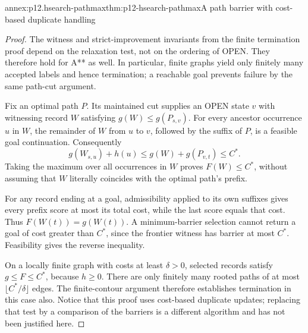 \begin{annexitem}{annex:p12.hsearch-pathmax}{thm:p12-hsearch-pathmax}{A path barrier with cost-based duplicate handling}
\begin{proof}
The witness and strict-improvement invariants from the finite termination
proof depend on the relaxation test, not on the ordering of OPEN.
They therefore hold for A** as well. In particular, finite graphs yield
only finitely many accepted labels and hence termination; a reachable
goal prevents failure by the same path-cut argument.

Fix an optimal path \(P\). Its maintained cut supplies an OPEN state
\(v\) with witnessing record \(W\) satisfying
\(g(W)\le g(P_{s,v})\). For every ancestor occurrence \(u\) in
\(W\), the remainder of \(W\) from \(u\) to \(v\), followed
by the suffix of \(P\), is a feasible goal continuation. Consequently
\[
 g(W_{s,u})+h(u)
 \le g(W)+g(P_{v,t})\le C^*.
\]
Taking the maximum over all occurrences in \(W\) proves
\(F(W)\le C^*\), without assuming that \(W\) literally coincides
with the optimal path's prefix.

For any record ending at a goal, admissibility applied to its own suffixes
gives every prefix score at most its total cost, while the last score
equals that cost. Thus \(F(W(t))=g(W(t))\). A minimum-barrier
selection cannot return a goal of cost greater than \(C^*\), since
the frontier witness has barrier at most \(C^*\). Feasibility gives
the reverse inequality.

On a locally finite graph with costs at least \(\delta>0\), selected
records satisfy \(g\le F\le C^*\), because \(h\ge 0\). There
are only finitely many rooted paths of at most
\(\lfloor C^*/\delta\rfloor\) edges. The finite-contour argument
therefore establishes termination in this case also. Notice that this
proof uses cost-based duplicate updates; replacing that test by a
comparison of the barriers is a different algorithm and has not been
justified here.
\end{proof}
\end{annexitem}
